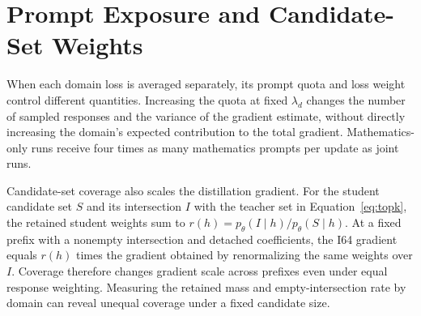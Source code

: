 \section{Prompt Exposure and Candidate-Set Weights}
\label{app:recipe_details}

When each domain loss is averaged separately, its prompt quota and loss weight control different quantities. Increasing the quota at fixed $\lambda_d$ changes the number of sampled responses and the variance of the gradient estimate, without directly increasing the domain's expected contribution to the total gradient. Mathematics-only runs receive four times as many mathematics prompts per update as joint runs.

Candidate-set coverage also scales the distillation gradient. For the student candidate set $S$ and its intersection $I$ with the teacher set in Equation~\ref{eq:topk}, the retained student weights sum to $r(h)=p_\theta(I\mid h)/p_\theta(S\mid h)$. At a fixed prefix with a nonempty intersection and detached coefficients, the I64 gradient equals $r(h)$ times the gradient obtained by renormalizing the same weights over $I$. Coverage therefore changes gradient scale across prefixes even under equal response weighting. Measuring the retained mass and empty-intersection rate by domain can reveal unequal coverage under a fixed candidate size.
